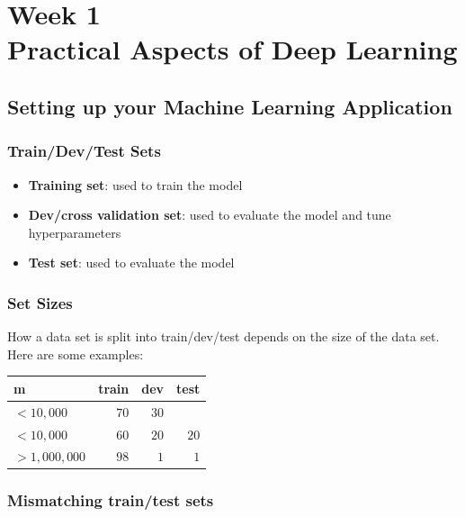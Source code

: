 
\chapter{Week 1 \\ Practical Aspects of Deep Learning}








\section{Setting up your Machine Learning Application}

\subsection*{Train/Dev/Test Sets}

\begin{itemize}
    \item \textbf{Training set}: used to train the model
    \item \textbf{Dev/cross validation set}: used to evaluate the model and tune hyperparameters
    \item \textbf{Test set}: used to evaluate the model
\end{itemize}

\subsection*{Set Sizes}

How a data set is split into train/dev/test depends on the size of the data set. Here are some examples: 

\begin{tabular}[t]{|l|r|r|r|}
    \hline
    m & train & dev & test \\
    \hline
    $<10,000$ & $70$ & $30$ & \\
    \hline
    $<10,000$ & $60$ & $20$ & $20$\\
    \hline 
    $>1,000,000$ & $98$ & $1$ & $1$\\
    \hline
\end{tabular}

\subsection*{Mismatching train/test sets}

